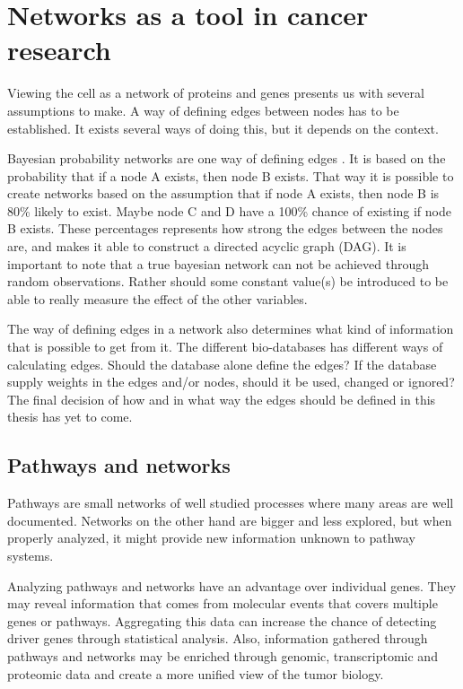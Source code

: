 \section{Networks as a tool in cancer research}
Viewing the cell as a network of proteins and genes presents us with several
assumptions to make. A way of defining edges between nodes has to be
established. It exists several ways of doing this, but it depends on the
context.

Bayesian probability networks are one way of defining edges
\cite{bayesiannetworks}. It is based on the probability that if a node A exists,
then node B exists. That way it is possible to create networks based on the
assumption that if node A exists, then node B is 80\% likely to exist. Maybe
node C and D have a 100\% chance of existing if node B exists.  These
percentages represents how strong the edges between the nodes are, and makes it
able to construct a directed acyclic graph (DAG). It is important to note that a
true bayesian network can not be achieved through random observations. Rather
should some constant value(s) be introduced to be able to really measure the
effect of the other variables.

The way of defining edges in a network also determines what kind of information
that is possible to get from it. The different bio-databases has different ways
of calculating edges. Should the database alone define the edges? If the
database supply weights in the edges and/or nodes, should it be used, changed or
ignored? The final decision of how and in what way the edges should be defined
in this thesis has yet to come. 

\subsection{Pathways and networks} %
Pathways are small networks of well studied processes where many areas are well
documented. Networks on the other hand are bigger and less explored, but when
properly analyzed, it might provide new information unknown to pathway systems.

Analyzing pathways and networks have an advantage over individual genes. They
may reveal information that comes from molecular events that covers multiple
genes or pathways. Aggregating this data can increase the chance of detecting
driver genes through statistical analysis. Also, information gathered through
pathways and networks may be enriched through genomic, transcriptomic and
proteomic data and create a more unified view of the tumor biology.

